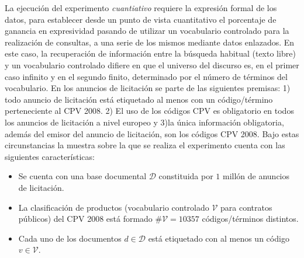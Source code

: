 \documentclass[a4paper,final,11pt,fleqn,twoside]{book}  %
\begin{document}
La ejecución del experimento \textit{cuantiativo} requiere la expresión formal de los datos, para establecer desde un punto 
de vista cuantitativo el porcentaje de ganancia en expresividad pasando de utilizar un vocabulario controlado para la realización 
de consultas, a una serie de los mismos mediante datos enlazados. En este caso, la recuperación de información 
entre la búsqueda habitual (texto libre) y un vocabulario controlado difiere en que el universo del discurso es, 
en el primer caso infinito y en el segundo finito, determinado por el número de términos del vocabulario. En los anuncios 
de licitación se parte de las siguientes premisas: 1) todo anuncio de licitación está etiquetado al menos 
con un código/término perteneciente al CPV 2008. 2) El uso de los códigos CPV es obligatorio en todos los anuncios de licitación a nivel europeo y 
3)la única información obligatoria, además del emisor del anuncio de licitación, son los códigos CPV 2008. Bajo estas circunstancias 
la muestra sobre la que se realiza el experimento cuenta con las siguientes características:
\begin{itemize}
 \item Se cuenta con una base documental $\mathcal{D}$ constituida por $1$ millón de anuncios de licitación.
 \item La clasificación de productos (vocabulario controlado $\mathcal{V}$ para contratos públicos) 
del CPV 2008 está formado $\#\mathcal{V} = 10357$ códigos/términos distintos.
 \item Cada uno de los documentos $d \in \mathcal{D}$ está etiquetado con al menos un código $v \in \mathcal{V}$.
\end{itemize}
\end{document}
